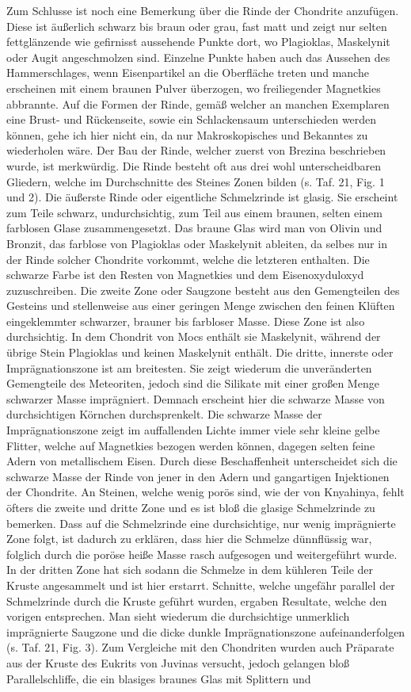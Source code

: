 \documentclass[a4paper, 11pt, oneside, polutonikogreek, german]{article}
\begin{document}
Zum Schlusse ist noch eine Bemerkung über die Rinde der Chondrite anzufügen. Diese ist äußerlich schwarz bis braun oder grau, fast matt und zeigt nur selten fettglänzende wie gefirnisst aussehende Punkte dort, wo Plagioklas, Maskelynit oder Augit angeschmolzen sind. Einzelne Punkte haben auch das Aussehen des Hammerschlages, wenn Eisenpartikel an die Oberfläche treten und manche erscheinen mit einem braunen Pulver überzogen, wo freiliegender Magnetkies abbrannte. Auf die Formen der Rinde, gemäß welcher an manchen Exemplaren eine Brust- und Rückenseite, sowie ein Schlackensaum unterschieden werden können, gehe ich hier nicht ein, da nur Makroskopisches und Bekanntes zu wiederholen wäre. Der Bau der Rinde, welcher zuerst von Brezina beschrieben wurde, ist merkwürdig. Die Rinde besteht oft aus drei wohl unterscheidbaren Gliedern, welche im Durchschnitte des Steines Zonen bilden (s. Taf. 21, Fig. 1 und 2). Die äußerste Rinde oder eigentliche Schmelzrinde ist glasig. Sie erscheint zum Teile schwarz, undurchsichtig, zum Teil aus einem braunen, selten einem farblosen Glase zusammengesetzt. Das braune Glas wird man von Olivin und Bronzit, das farblose von Plagioklas oder Maskelynit ableiten, da selbes nur in der Rinde solcher Chondrite vorkommt, welche die letzteren enthalten. Die schwarze Farbe ist den Resten von Magnetkies und dem Eisenoxyduloxyd zuzuschreiben. Die zweite Zone oder Saugzone besteht aus den Gemengteilen des Gesteins und stellenweise aus einer geringen Menge zwischen den feinen Klüften eingeklemmter schwarzer, brauner bis farbloser Masse. Diese Zone ist also durchsichtig. In dem Chondrit von Mocs enthält sie Maskelynit, während der übrige Stein Plagioklas und keinen Maskelynit enthält. Die dritte, innerste oder Imprägnationszone ist am breitesten. Sie zeigt wiederum die unveränderten Gemengteile des Meteoriten, jedoch sind die Silikate mit einer großen Menge schwarzer Masse imprägniert. Demnach erscheint hier die schwarze Masse von durchsichtigen Körnchen durchsprenkelt. Die schwarze Masse der Imprägnationszone zeigt im auffallenden Lichte immer viele sehr kleine gelbe Flitter, welche auf Magnetkies bezogen werden können, dagegen selten feine Adern von metallischem Eisen. Durch diese Beschaffenheit unterscheidet sich die schwarze Masse der Rinde von jener in den Adern und gangartigen Injektionen der Chondrite. An Steinen, welche wenig porös sind, wie der von Knyahinya, fehlt öfters die zweite und dritte Zone und es ist bloß die glasige Schmelzrinde zu bemerken. Dass auf die Schmelzrinde eine durchsichtige, nur wenig imprägnierte Zone folgt, ist dadurch zu erklären, dass hier die Schmelze dünnflüssig war, folglich durch die poröse heiße Masse rasch aufgesogen und weitergeführt wurde. In der dritten Zone hat sich sodann die Schmelze in dem kühleren Teile der Kruste angesammelt und ist hier erstarrt. Schnitte, welche ungefähr parallel der Schmelzrinde durch die Kruste geführt wurden, ergaben Resultate, welche den vorigen entsprechen. Man sieht wiederum die durchsichtige unmerklich imprägnierte Saugzone und die dicke dunkle Imprägnationszone aufeinanderfolgen (s. Taf. 21, Fig. 3). Zum Vergleiche mit den Chondriten wurden auch Präparate aus der Kruste des Eukrits von Juvinas versucht, jedoch gelangen bloß Parallelschliffe, die ein blasiges braunes Glas mit Splittern und 
\end{document}
